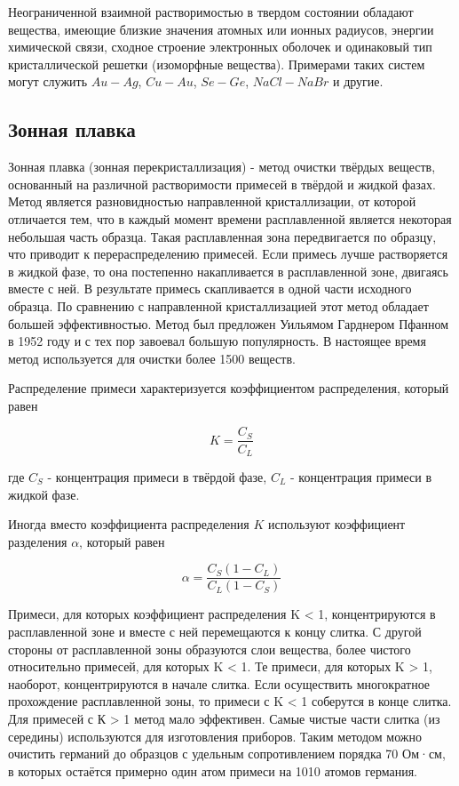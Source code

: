 \documentclass[14pt,a4paper]{scrartcl}
\begin{document}
Неограниченной взаимной растворимостью в твердом состоянии обладают вещества, имеющие близкие значения атомных или ионных радиусов, энергии химической связи, сходное строение электронных оболочек и одинаковый тип кристаллической решетки (изоморфные вещества). Примерами таких систем могут служить $Au-Ag$, $Cu-Au$, $Se-Ge$, $NaCl-NaBr$ и другие.

\subsection*{Зонная плавка}

Зонная плавка (зонная перекристаллизация) - метод очистки твёрдых веществ, основанный на различной растворимости примесей в твёрдой и жидкой фазах. Метод является разновидностью направленной кристаллизации, от которой отличается тем, что в каждый момент времени расплавленной является некоторая небольшая часть образца. Такая расплавленная зона передвигается по образцу, что приводит к перераспределению примесей. Если примесь лучше растворяется в жидкой фазе, то она постепенно накапливается в расплавленной зоне, двигаясь вместе с ней. В результате примесь скапливается в одной части исходного образца. По сравнению с направленной кристаллизацией этот метод обладает большей эффективностью. Метод был предложен Уильямом Гарднером Пфанном в 1952 году и с тех пор завоевал большую популярность. В настоящее время метод используется для очистки более 1500 веществ.

Распределение примеси характеризуется коэффициентом распределения, который равен

$$ K={\frac {C_{S}}{C_{L}}}$$

где $C_S$ - концентрация примеси в твёрдой фазе, $C_L$ - концентрация примеси в жидкой фазе.

Иногда вместо коэффициента распределения $K$ используют коэффициент разделения $\alpha$, который равен

$$\alpha ={\frac {C_{S}(1-C_{L})}{C_{L}(1-C_{S})}}$$

Примеси, для которых коэффициент распределения K < 1, концентрируются в расплавленной зоне и вместе с ней перемещаются к концу слитка. С другой стороны от расплавленной зоны образуются слои вещества, более чистого относительно примесей, для которых K < 1. Те примеси, для которых K > 1, наоборот, концентрируются в начале слитка. Если осуществить многократное прохождение расплавленной зоны, то примеси с K < 1 соберутся в конце слитка. Для примесей с К > 1 метод мало эффективен. Самые чистые части слитка (из середины) используются для изготовления приборов. Таким методом можно очистить германий до образцов с удельным сопротивлением порядка 70 Ом·см, в которых остаётся примерно один атом примеси на 1010 атомов германия.
\end{document}
